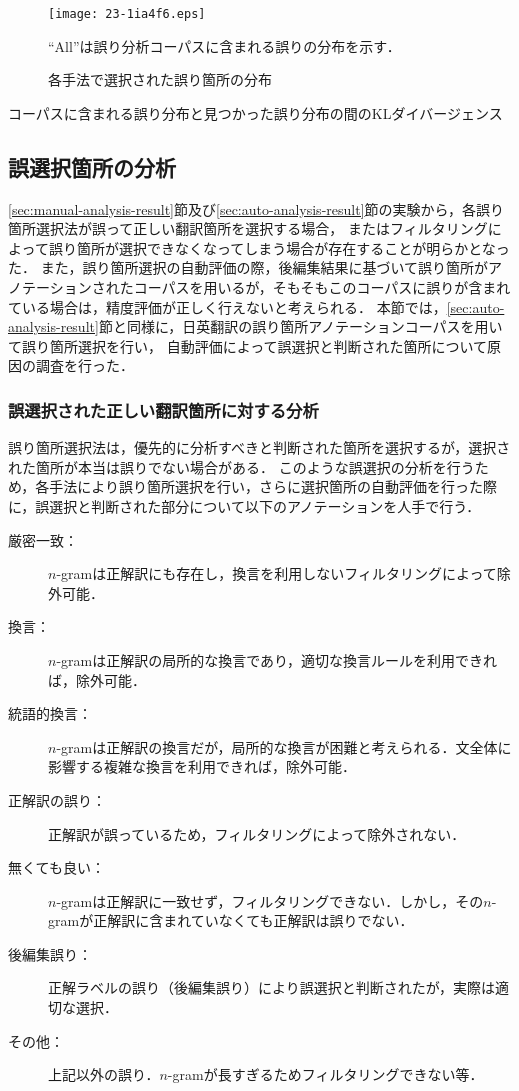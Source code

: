 \documentclass[japanese]{jnlp_1.4}
\begin{document}
\begin{figure}[t]
\begin{center}
\texttt{[image: 23-1ia4f6.eps]}
\end{center}
\caption{各手法で選択された誤り箇所の分布}
\small\centerline{``All''は誤り分析コーパスに含まれる誤りの分布を示す．}
\label{fig:details}
\end{figure}
\begin{table}[t]
\caption{コーパスに含まれる誤り分布と見つかった誤り分布の間のKLダイバージェンス}
\label{tab:kl}

\end{table}


\subsection{誤選択箇所の分析}
\label{sec:selection-error-analysis}

\ref{sec:manual-analysis-result}節及び\ref{sec:auto-analysis-result}節の実験から，各誤り箇所選択法が誤って正しい翻訳箇所を選択する場合，
またはフィルタリングによって誤り箇所が選択できなくなってしまう場合が存在することが明らかとなった．
また，誤り箇所選択の自動評価の際，後編集結果に基づいて誤り箇所がアノテーションされたコーパスを用いるが，そもそもこのコーパスに誤りが含まれている場合は，精度評価が正しく行えないと考えられる．
本節では，\ref{sec:auto-analysis-result}節と同様に，日英翻訳の誤り箇所アノテーションコーパスを用いて誤り箇所選択を行い，
自動評価によって誤選択と判断された箇所について原因の調査を行った．


\subsubsection{誤選択された正しい翻訳箇所に対する分析}

誤り箇所選択法は，優先的に分析すべきと判断された箇所を選択するが，選択された箇所が本当は誤りでない場合がある．
このような誤選択の分析を行うため，各手法により誤り箇所選択を行い，さらに選択箇所の自動評価を行った際に，誤選択と判断された部分について以下のアノテーションを人手で行う．

\begin{description}
\item[厳密一致：] $n$-gramは正解訳にも存在し，換言を利用しないフィルタリングによって除外可能．
\item[換言：] $n$-gramは正解訳の局所的な換言であり，適切な換言ルールを利用できれば，除外可能．
\item[統語的換言：] $n$-gramは正解訳の換言だが，局所的な換言が困難と考えられる．文全体に影響する複雑な換言を利用できれば，除外可能．
\item[正解訳の誤り：] 正解訳が誤っているため，フィルタリングによって除外されない．
\item[無くても良い：] $n$-gramは正解訳に一致せず，フィルタリングできない．しかし，その$n$-gramが正解訳に含まれていなくても正解訳は誤りでない．
\item[後編集誤り：] 正解ラベルの誤り（後編集誤り）により誤選択と判断されたが，実際は適切な選択．
\item[その他：] 上記以外の誤り．$n$-gramが長すぎるためフィルタリングできない等．
\end{description}
\end{document}
